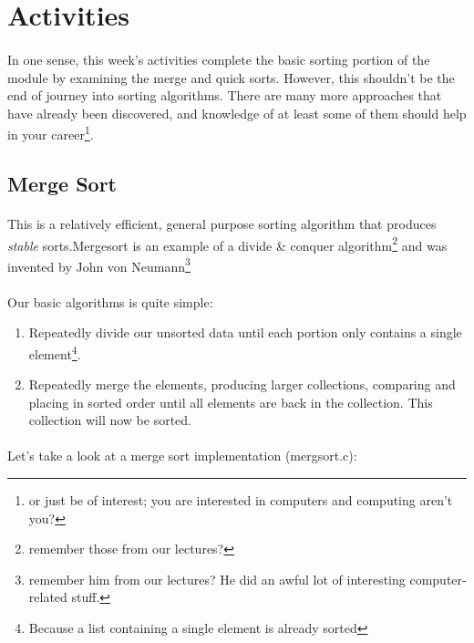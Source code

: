 \documentclass[10pt, a4paper, twosize]{article}
\begin{document}
\section{Activities}
\paragraph{} In one sense, this week's activities complete the basic sorting portion of the module by examining the merge and quick sorts. However, this shouldn't be the end of journey into sorting algorithms. There are many more approaches that have already been discovered, and knowledge of at least some of them should help in your career\footnote{or just be of interest; you are interested in computers and computing aren't you?}.

\subsection{Merge Sort}

\paragraph{} This is a relatively efficient, general purpose sorting algorithm that produces \emph{stable} sorts.Mergesort is an example of a divide \& conquer algorithm\footnote{remember those from our lectures?} and was invented by John von Neumann\footnote{remember him from our lectures? He did an awful lot of interesting computer-related stuff.}

\paragraph{} Our basic algorithms is quite simple:

\begin{enumerate}
\item Repeatedly divide our unsorted data until each portion only contains a single element\footnote{Because a list containing a single element is already sorted}.
\item Repeatedly merge the elements, producing larger collections, comparing and placing in sorted order until all elements are back in the collection. This collection will now be sorted.
\end{enumerate}

\paragraph{} Let's take a look at a merge sort implementation (mergsort.c):
\end{document}
